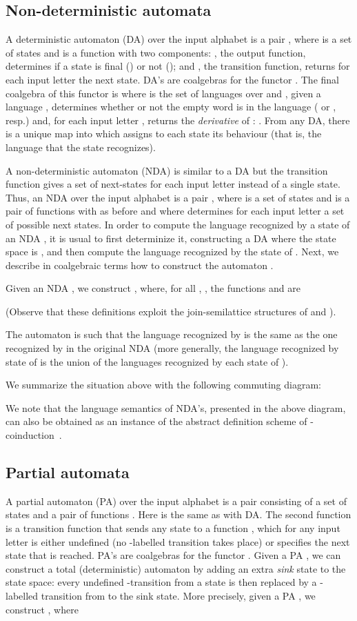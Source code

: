 \documentclass{LMCS}
\begin{document}
\subsection{Non-deterministic automata}
A deterministic automaton (DA) over the input alphabet  is a pair
, where  is a set of states and  is a function with two components: , the output
function, determines if a state  is final () or not
(); and , the transition function, returns for each
input letter  the next state. DA's are coalgebras for the functor
. The final coalgebra of this functor is
 where  is the set of
languages over  and , given a language ,
determines whether or not the empty word is in the language
( or , resp.) and, for each input
letter , returns the {\em derivative} of : .
From any DA, there is a unique map  into  which assigns
to each state its behaviour (that is, the language that the state
recognizes).

A non-deterministic automaton (NDA) is similar to a DA but the
transition function gives a set of next-states for each input letter
instead of a single state. Thus, an NDA over the input alphabet 
is a pair , where  is a set of states and
 is a pair of functions
with  as before and where  determines for each input
letter  a set of possible next states. In order to compute the
language recognized by a state  of an NDA , it is
usual to first determinize it, constructing a DA
 where the state space is , and
then compute the language recognized by the state  of
. Next, we describe in coalgebraic terms
how to construct the automaton .

Given an NDA , we construct
, where, for
all , , the functions  and  are
 
(Observe that these definitions exploit the join-semilattice structures of  and ).

The automaton
  is such that the language 
recognized by  is the same as the one recognized by  in
the original NDA  (more generally, the language
recognized by state  of  is the union
of the languages recognized by each state  of ).



We summarize the situation above with the following commuting diagram:

We note that the language semantics of NDA's,
presented in the above diagram, can also be obtained as an instance of
the abstract definition scheme of -coinduction~\cite{bartels,jacobs05}.
\subsection{Partial automata}
A partial automaton (PA) over the input alphabet  is a pair
 consisting of a set of states  and a pair of
functions .
Here  is the same as with DA. The second function  is
a transition function that sends any state  to a function
, which for any input letter 
is either undefined (no -labelled transition takes place)
or specifies the next state that is reached.
 PA's are coalgebras for the functor
.  Given a PA , we can
construct a total (deterministic) automaton
 by adding an extra {\em sink} state to
the state space: every undefined -transition from a state  is then
replaced by a -labelled transition from  to the sink state.
More precisely, given a  PA , we construct
,
where
\end{document}
